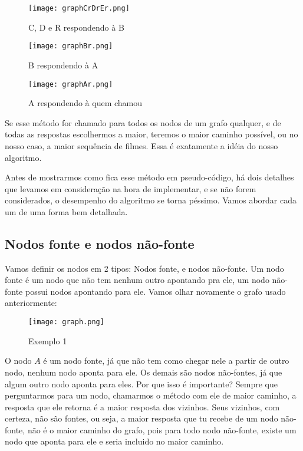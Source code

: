 \documentclass[12pt]{article}
\begin{document}
\begin{figure}[H]
\centering
\texttt{[image: graphCrDrEr.png]}
\caption{C, D e R respondendo à B}
\label{graphCrDrE}
\end{figure}

\begin{figure}[H]
\centering
\texttt{[image: graphBr.png]}
\caption{B respondendo à A}
\label{graphBr}
\end{figure}

\begin{figure}[H]
\centering
\texttt{[image: graphAr.png]}
\caption{A respondendo à quem chamou}
\label{graphAr}
\end{figure}

Se esse método for chamado para todos os nodos de um grafo qualquer, e de todas as respostas escolhermos a maior, teremos o maior caminho possível, ou no nosso caso, a maior sequência de filmes. Essa é exatamente a idéia do nosso algoritmo.

Antes de mostrarmos como fica esse método em pseudo-código, há dois detalhes que levamos em consideração na hora de implementar, e se não forem considerados, o desempenho do algoritmo se torna péssimo. Vamos abordar cada um de uma forma bem detalhada.

\subsection{Nodos fonte e nodos não-fonte}

Vamos definir os nodos em 2 tipos: Nodos fonte, e nodos não-fonte. Um nodo fonte é um nodo que não tem nenhum outro apontando pra ele, um nodo não-fonte possui nodos apontando para ele. Vamos olhar novamente o grafo usado anteriormente:

\begin{figure}[H]
\centering
\texttt{[image: graph.png]}
\caption{Exemplo 1}
\label{graphex}
\end{figure}

O nodo $A$ é um nodo fonte, já que não tem como chegar nele a partir de outro nodo, nenhum nodo aponta para ele. Os demais são nodos não-fontes, já que algum outro nodo aponta para eles. Por que isso é importante? Sempre que perguntarmos para um nodo, chamarmos o método com ele de maior caminho, a resposta que ele retorna é a maior resposta dos vizinhos. Seus vizinhos, com certeza, não são fontes, ou seja, a maior resposta que tu recebe de um nodo não-fonte, não é o maior caminho do grafo, pois para todo nodo não-fonte, existe um nodo que aponta para ele e seria incluido no maior caminho.
\end{document}
